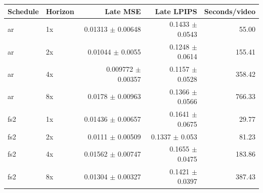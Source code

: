 \begin{tabular}{llrrr}
\toprule
Schedule & Horizon & Late MSE & Late LPIPS & Seconds/video\\
\midrule
ar & 1x & 0.01313 $\pm$ 0.00648 & 0.1433 $\pm$ 0.0543 & 55.00\\
ar & 2x & 0.01044 $\pm$ 0.0055 & 0.1248 $\pm$ 0.0614 & 155.41\\
ar & 4x & 0.009772 $\pm$ 0.00357 & 0.1157 $\pm$ 0.0528 & 358.42\\
ar & 8x & 0.0178 $\pm$ 0.00963 & 0.1366 $\pm$ 0.0566 & 766.33\\
fs2 & 1x & 0.01436 $\pm$ 0.00657 & 0.1641 $\pm$ 0.0675 & 29.77\\
fs2 & 2x & 0.0111 $\pm$ 0.00509 & 0.1337 $\pm$ 0.053 & 81.23\\
fs2 & 4x & 0.01562 $\pm$ 0.00747 & 0.1655 $\pm$ 0.0475 & 183.86\\
fs2 & 8x & 0.01304 $\pm$ 0.00327 & 0.1421 $\pm$ 0.0397 & 387.43\\
\bottomrule
\end{tabular}
